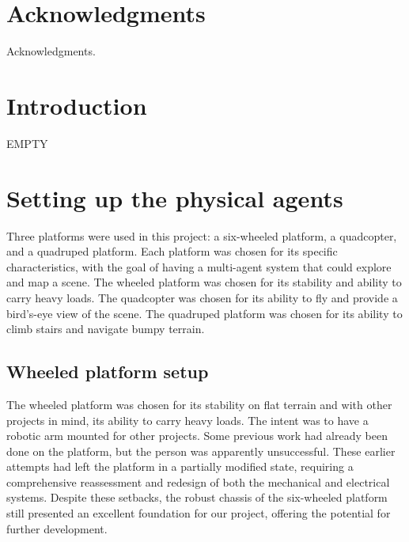 \documentclass[12pt]{article}
\begin{document}
\newpage
\section*{Acknowledgments}

    Acknowledgments.
    
\newpage
\thispagestyle{empty}
\mbox{}
\newpage
\thispagestyle{empty}
{\small \tableofcontents}

\newpage
\thispagestyle{empty}
\mbox{}
\newpage

\section{Introduction}

    EMPTY


\newpage

\section[Setting up the physical agents]{Setting up the physical agents}
\label{section:big title}%

        Three platforms were used in this project: a six-wheeled platform, a quadcopter, and a quadruped platform. Each platform was chosen for its specific characteristics, with the goal of having a multi-agent system that could explore and map a scene. The wheeled platform was chosen for its stability and ability to carry heavy loads. The quadcopter was chosen for its ability to fly and provide a bird's-eye view of the scene. The quadruped platform was chosen for its ability to climb stairs and navigate bumpy terrain.

    \subsection{Wheeled platform setup}

        The wheeled platform was chosen for its stability on flat terrain and with other projects in mind, its ability to carry heavy loads. The intent was to have a robotic arm mounted for other projects. Some previous work had already been done on the platform, but the person was apparently unsuccessful. These earlier attempts had left the platform in a partially modified state, requiring a comprehensive reassessment and redesign of both the mechanical and electrical systems. Despite these setbacks, the robust chassis of the six-wheeled platform still presented an excellent foundation for our project, offering the potential for further development.
\end{document}

